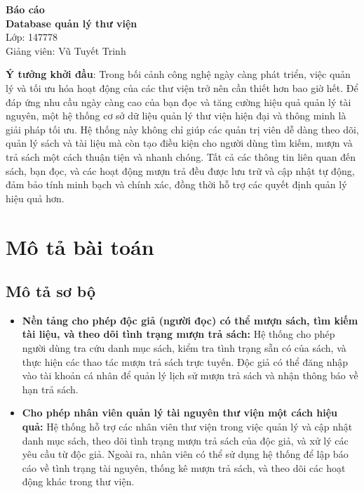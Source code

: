 \documentclass[12pt]{article}
\begin{document}
\begin{center}
    
    \vfill
  \end{center}  
\newpage
\begin{center}
   \large \textbf{Báo cáo\\}
   \normalsize \textbf{Database quản lý thư viện\\}
   \small
   Lớp: 147778\\
   Giảng viên: Vũ Tuyết Trinh\\
    
\end{center}
\tableofcontents %
\clearpage %

\noindent \textbf{Ý tưởng khởi đầu}:
Trong bối cảnh công nghệ ngày càng phát triển, việc quản lý và tối ưu hóa hoạt động của các thư viện trở nên cần thiết hơn bao giờ hết. Để đáp ứng nhu cầu ngày càng cao của bạn đọc và tăng cường hiệu quả quản lý tài nguyên, một hệ thống cơ sở dữ liệu quản lý thư viện hiện đại và thông minh là giải pháp tối ưu. Hệ thống này không chỉ giúp các quản trị viên dễ dàng theo dõi, quản lý sách và tài liệu mà còn tạo điều kiện cho người dùng tìm kiếm, mượn và trả sách một cách thuận tiện và nhanh chóng. Tất cả các thông tin liên quan đến sách, bạn đọc, và các hoạt động mượn trả đều được lưu trữ và cập nhật tự động, đảm bảo tính minh bạch và chính xác, đồng thời hỗ trợ các quyết định quản lý hiệu quả hơn.

\section{Mô tả bài toán}

\subsection{Mô tả sơ bộ}
\begin{itemize}[leftmargin=1.5cm]
    \item \textbf{Nền tảng cho phép độc giả (người đọc) có thể mượn sách, tìm kiếm tài liệu, và theo dõi tình trạng mượn trả sách:} Hệ thống cho phép người dùng tra cứu danh mục sách, kiểm tra tình trạng sẵn có của sách, và thực hiện các thao tác mượn trả sách trực tuyến. Độc giả có thể đăng nhập vào tài khoản cá nhân để quản lý lịch sử mượn trả sách và nhận thông báo về hạn trả sách.
    \item \textbf{Cho phép nhân viên quản lý tài nguyên thư viện một cách hiệu quả:} Hệ thống hỗ trợ các nhân viên thư viện trong việc quản lý và cập nhật danh mục sách, theo dõi tình trạng mượn trả sách của độc giả, và xử lý các yêu cầu từ độc giả. Ngoài ra, nhân viên có thể sử dụng hệ thống để lập báo cáo về tình trạng tài nguyên, thống kê mượn trả sách, và theo dõi các hoạt động khác trong thư viện.
\end{itemize}
\end{document}

